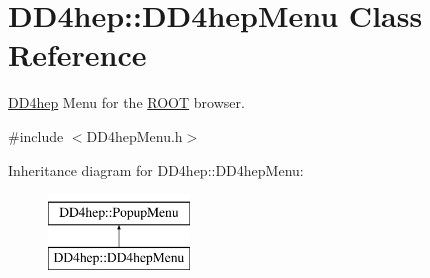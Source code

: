\hypertarget{class_d_d4hep_1_1_d_d4hep_menu}{}\section{D\+D4hep\+:\+:D\+D4hep\+Menu Class Reference}
\label{class_d_d4hep_1_1_d_d4hep_menu}


\hyperlink{namespace_d_d4hep}{D\+D4hep} Menu for the \hyperlink{namespace_r_o_o_t}{R\+O\+OT} browser.  




{\ttfamily \#include $<$D\+D4hep\+Menu.\+h$>$}

Inheritance diagram for D\+D4hep\+:\+:D\+D4hep\+Menu\+:\begin{figure}[H]
\begin{center}
\leavevmode
\includegraphics[height=2.000000cm]{class_d_d4hep_1_1_d_d4hep_menu}
\end{center}
\end{figure}
